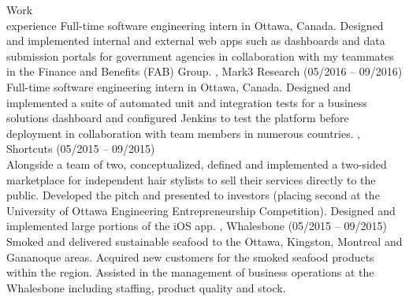 \documentclass{resume}
\begin{document}
\begin{category}{Work \\experience}
Full-time software engineering intern in Ottawa, Canada. Designed and implemented internal
and external web apps such as dashboards and data submission portals for government agencies
in collaboration with my teammates in the Finance and Benefits (FAB) Group.
, Mark3 Research (05/2016 -- 09/2016)\\
Full-time software engineering intern in Ottawa, Canada. Designed and implemented a suite
of automated unit and integration tests for a business solutions dashboard and configured
Jenkins to test the platform before deployment in collaboration with team members in
numerous countries.
, Shortcuts (05/2015 -- 09/2015)\\
Alongside a team of two, conceptualized, defined and implemented a two-sided marketplace for
independent hair stylists to sell their services directly to the public. Developed
the pitch and presented to investors (placing second at the University of
Ottawa Engineering Entrepreneurship Competition). 
Designed and implemented large portions of the iOS app.
, Whalesbone (05/2015 -- 09/2015)\\
Smoked and delivered sustainable seafood to the Ottawa, Kingston, Montreal
and Gananoque areas. Acquired new customers for the smoked seafood products within the region.
Assisted in the management of business operations at the Whalesbone including staffing,
product quality and stock.
\end{category}



\end{document}
